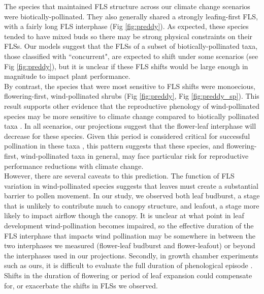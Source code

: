 \documentclass[12pt]{article}\usepackage[]{graphicx}\usepackage[]{color}
\begin{document}
\noindent The species that maintained FLS structure across our climate change scenarios were biotically-pollinated. They also generally shared a strongly leafing-first FLS, with a fairly long FLS interphase (Fig \ref{fig:preddy}). As expected, these species tended to have mixed buds so there may be strong physical constraints on their FLSs. Our models suggest that the FLSs of a subset of biotically-pollinated taxa, those classified with ``concurrent", are expected to shift under some scenarios (see Fig \ref{fig:preddy}), but  it is unclear if these FLS shifts would be large enough in magnitude to impact plant performance.\\

\noindent By contrast, the species that were most sensitive to FLS shifts were monoecious, flowering-first, wind-pollinated shrubs (Fig \ref{fig:preddy}, Fig \ref{fig:preddy_sp}). This result supports other evidence that the reproductive phenology of wind-pollinated species may be more sensitive to climate change compared to biotically pollinated taxa \citep{Ziello:2012aa}. In all scenarios, our projections suggest that the flower-leaf interphase will decrease for these species. Given this period is considered critical for successful pollination in these taxa \citep{Whitehead1969}, this pattern suggests that these species, and flowering-first, wind-pollinated taxa in general, may face particular risk for reproductive performance reductions with climate change.\\

\noindent However, there are several caveats to this prediction. The function of FLS variation in wind-pollinated species suggests that leaves must create a substantial barrier to pollen movement. In our study, we observed both leaf budburst, a stage that is unlikely to contribute much to canopy structure, and leafout, a stage more likely to impact airflow though the canopy. It is unclear at what point in leaf development wind-pollination becomes impaired, so the effective duration of the FLS interphase that impacts wind pollination may be somewhere in between the two interphases we measured (flower-leaf budburst and flower-leafout) or beyond the interphases used in our projections. Secondly, in growth chamber experiments such as ours, it is difficult to evaluate the full duration of  phenological episode \citep{Primack2015}. Shifts in the duration of flowering or period of leaf expansion could compensate for, or exacerbate the shifts in FLSs we observed.\\ 
\end{document}
